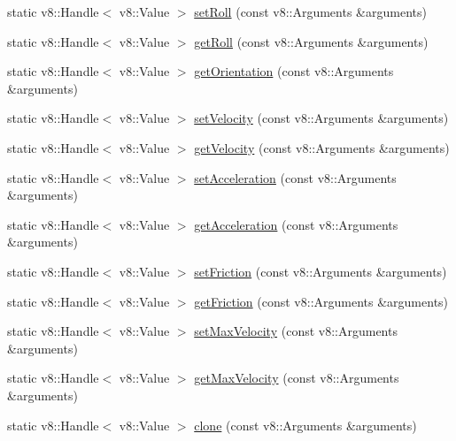 \begin{DoxyCompactItemize}
\item 
static v8\-::\-Handle$<$ v8\-::\-Value $>$ \hyperlink{class_rad_xml_1_1_movable_class_a89c8179b57caa9847ad37186df34f7a5}{set\-Roll} (const v8\-::\-Arguments \&arguments)
\item 
static v8\-::\-Handle$<$ v8\-::\-Value $>$ \hyperlink{class_rad_xml_1_1_movable_class_a894f9595673a389c3e5b936440b7510f}{get\-Roll} (const v8\-::\-Arguments \&arguments)
\item 
static v8\-::\-Handle$<$ v8\-::\-Value $>$ \hyperlink{class_rad_xml_1_1_movable_class_afab024ad0ad1bd42ad057b1a55bbe624}{get\-Orientation} (const v8\-::\-Arguments \&arguments)
\item 
static v8\-::\-Handle$<$ v8\-::\-Value $>$ \hyperlink{class_rad_xml_1_1_movable_class_ac16abb394c5df4084af661e93ad31702}{set\-Velocity} (const v8\-::\-Arguments \&arguments)
\item 
static v8\-::\-Handle$<$ v8\-::\-Value $>$ \hyperlink{class_rad_xml_1_1_movable_class_a534aca86b8423191b95453fc13b20e9c}{get\-Velocity} (const v8\-::\-Arguments \&arguments)
\item 
static v8\-::\-Handle$<$ v8\-::\-Value $>$ \hyperlink{class_rad_xml_1_1_movable_class_aff44232c2efa9ae8b4e3a46c77332048}{set\-Acceleration} (const v8\-::\-Arguments \&arguments)
\item 
static v8\-::\-Handle$<$ v8\-::\-Value $>$ \hyperlink{class_rad_xml_1_1_movable_class_a741952067c9320238ae258da06985182}{get\-Acceleration} (const v8\-::\-Arguments \&arguments)
\item 
static v8\-::\-Handle$<$ v8\-::\-Value $>$ \hyperlink{class_rad_xml_1_1_movable_class_aa98be3fdcbe2f5e9375cd092f1f4b086}{set\-Friction} (const v8\-::\-Arguments \&arguments)
\item 
static v8\-::\-Handle$<$ v8\-::\-Value $>$ \hyperlink{class_rad_xml_1_1_movable_class_aa60d189867a3d0e3d75616692273b9bd}{get\-Friction} (const v8\-::\-Arguments \&arguments)
\item 
static v8\-::\-Handle$<$ v8\-::\-Value $>$ \hyperlink{class_rad_xml_1_1_movable_class_a5e53b24e98a4765e2a67bb5344fd3072}{set\-Max\-Velocity} (const v8\-::\-Arguments \&arguments)
\item 
static v8\-::\-Handle$<$ v8\-::\-Value $>$ \hyperlink{class_rad_xml_1_1_movable_class_a881000a349a2b9b915fdbb1434f04d5a}{get\-Max\-Velocity} (const v8\-::\-Arguments \&arguments)
\item 
static v8\-::\-Handle$<$ v8\-::\-Value $>$ \hyperlink{class_rad_xml_1_1_movable_class_adb7d5df899eca19eee871642f241ebbe}{clone} (const v8\-::\-Arguments \&arguments)

\end{DoxyCompactItemize}
